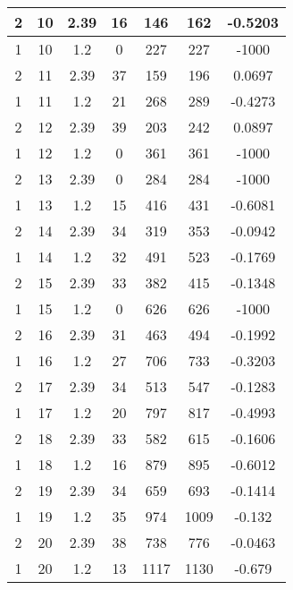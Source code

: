 \documentclass[letterpaper, 12pt]{article}
\begin{document}
\begin{longtable}{|c|c|c|c|c|c|c|}
\hline
2 & 10 & 2.39 & 16 & 146 & 162 & -0.5203 \\
\hline
1 & 10 & 1.2 & 0 & 227 & 227 & -1000 \\
\hline
2 & 11 & 2.39 & 37 & 159 & 196 & 0.0697 \\
\hline
1 & 11 & 1.2 & 21 & 268 & 289 & -0.4273 \\
\hline
2 & 12 & 2.39 & 39 & 203 & 242 & 0.0897 \\
\hline
1 & 12 & 1.2 & 0 & 361 & 361 & -1000 \\
\hline
2 & 13 & 2.39 & 0 & 284 & 284 & -1000 \\
\hline
1 & 13 & 1.2 & 15 & 416 & 431 & -0.6081 \\
\hline
2 & 14 & 2.39 & 34 & 319 & 353 & -0.0942 \\
\hline
1 & 14 & 1.2 & 32 & 491 & 523 & -0.1769 \\
\hline
2 & 15 & 2.39 & 33 & 382 & 415 & -0.1348 \\
\hline
1 & 15 & 1.2 & 0 & 626 & 626 & -1000 \\
\hline
2 & 16 & 2.39 & 31 & 463 & 494 & -0.1992 \\
\hline
1 & 16 & 1.2 & 27 & 706 & 733 & -0.3203 \\
\hline
2 & 17 & 2.39 & 34 & 513 & 547 & -0.1283 \\
\hline
1 & 17 & 1.2 & 20 & 797 & 817 & -0.4993 \\
\hline
2 & 18 & 2.39 & 33 & 582 & 615 & -0.1606 \\
\hline
1 & 18 & 1.2 & 16 & 879 & 895 & -0.6012 \\
\hline
2 & 19 & 2.39 & 34 & 659 & 693 & -0.1414 \\
\hline
1 & 19 & 1.2 & 35 & 974 & 1009 & -0.132 \\
\hline
2 & 20 & 2.39 & 38 & 738 & 776 & -0.0463 \\
\hline
1 & 20 & 1.2 & 13 & 1117 & 1130 & -0.679 \\
\hline
\end{longtable}
\end{document}

